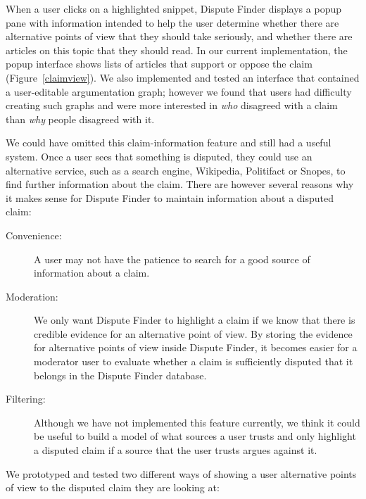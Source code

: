 \documentclass{www2010-accepted}
\begin{document}
When a user clicks on a highlighted snippet, Dispute Finder displays a popup pane with information intended to help the user determine whether there are alternative points of view that they should take seriously, and whether there are articles on this topic that they should read. In our current implementation, the popup interface shows lists of articles that support or oppose the claim (Figure~\ref{claimview}). We also implemented and tested an interface that contained a user-editable argumentation graph; however we found that users had difficulty creating such graphs and were more interested in {\it who} disagreed with a claim than {\it why} people disagreed with it.

We could have omitted this claim-information feature and still had a useful system. Once a user sees that something is disputed, they could use an alternative service, such as a search engine, Wikipedia, Politifact or Snopes, to find further information about the claim. There are however several reasons why it makes sense for Dispute Finder to maintain information about a disputed claim:

\begin{description}
\item[Convenience:] A user may not have the patience to search for a good source of information about a claim. 
\item[Moderation:] We only want Dispute Finder to highlight a claim if we know that there is credible evidence for an alternative point of view. By storing the evidence for alternative points of view inside Dispute Finder, it becomes easier for a moderator user to evaluate whether a claim is sufficiently disputed that it belongs in the Dispute Finder database.
\item[Filtering:] Although we have not implemented this feature currently, we think it could be useful to build a model of what sources a user trusts and only highlight a disputed claim if a source that the user trusts argues against it.
\end{description}


We prototyped and tested two different ways of showing a user alternative points of view to the disputed claim they are looking at:
\end{document}
